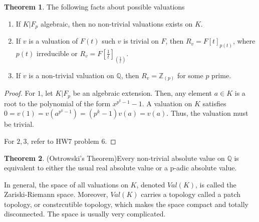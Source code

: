 \documentclass{article}
\theoremstyle{definition}
\newtheorem{theorem}{Theorem}[section]
\theoremstyle{definition}
\theoremstyle{definition}
\theoremstyle{definition}
\theoremstyle{definition}
\theoremstyle{definition}
\theoremstyle{definition}
\begin{document}
\begin{tcolorbox}[colback=red!5!white,colframe=red!30!white]
\begin{theorem}
    The following facts about possible valuations
\begin{enumerate}
    \item If $K|F_p$ algebraic, then no non-trivial valuations exists on $K$.
    \item If $v$ is a valuation of $F(t)$ such $v$ is trivial on $F$, then $R_v=F[t]_{p(t)}$, where $p(t)$ irreducible or $R_v=F[\frac{1}{t}]_{(\frac{1}{t})}$. 
    \item If $v$ is a non-trivial valuation on $\mathbb{Q}$, then $R_v=\mathbb{Z}_{(p)}$ for some $p$ prime. 
\end{enumerate}
\end{theorem}
\end{tcolorbox}
\begin{proof}
    For $1$, let $K|F_p$ be an algebraic extension. Then, any element $a\in K$ is a root to the polynomial of the form $x^{p^k-1}-1$. A valuation on $K$ satisfies $0=v(1)=v(a^{p^k-1})=(p^k-1)v(a)=v(a)$. Thus, the valuation must be trivial.

    For $2,3$, refer to HW$7$ problem $6$.
\end{proof}



\begin{tcolorbox}[colback=red!5!white,colframe=red!30!white]
\begin{theorem}
(Ostrowski's Theorem)Every non-trivial absolute value on $\mathbb{Q}$ is equivalent to either the usual real absolute value or a p-adic absolute value.
\end{theorem}
\end{tcolorbox}

In general, the space of all valuations on $K$, denoted $Val(K)$, is called the Zariski-Riemann space. Moreover, $Val(K)$ carries a topology called a patch topology, or constrcutible topology, which makes the space compact and totally disconnected. The space is usually very complicated.
\end{document}

